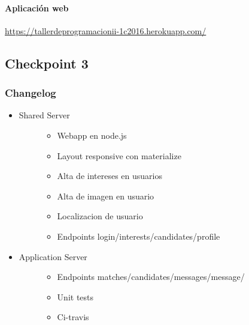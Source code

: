 \documentclass[letterpaper,10pt,english]{sphinxmanual}
\begin{document}
\paragraph{Aplicación web}
\label{manuals:id5}
\href{https://tallerdeprogramacionii-1c2016.herokuapp.com/}{https://tallerdeprogramacionii-1c2016.herokuapp.com/}


\subsection{Checkpoint 3}
\label{manuals:checkpoint-3}

\subsubsection{Changelog}
\label{manuals:id6}\begin{itemize}
\item {} \begin{description}
\item[{Shared Server}] \leavevmode\begin{itemize}
\item {} 
Webapp en node.js

\item {} 
Layout responsive con materialize

\item {} 
Alta de intereses en usuarios

\item {} 
Alta de imagen en usuario

\item {} 
Localizacion de usuario

\item {} 
Endpoints login/interests/candidates/profile

\end{itemize}

\end{description}

\item {} \begin{description}
\item[{Application Server}] \leavevmode\begin{itemize}
\item {} 
Endpoints matches/candidates/messages/message/

\item {} 
Unit tests

\item {} 
Ci-travis


\end{itemize}
\end{description}
\end{itemize}
\end{document}
